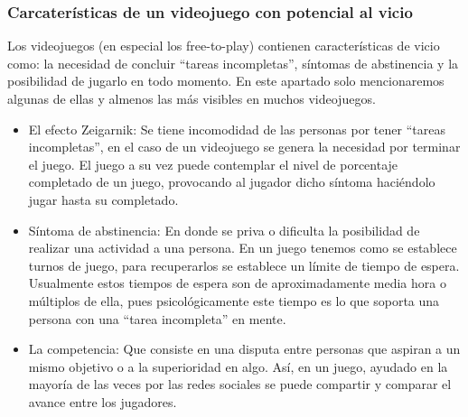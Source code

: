 \subsubsection{Carcaterísticas de un videojuego con potencial al vicio}
Los videojuegos (en especial los free-to-play) contienen características de vicio como: la necesidad de concluir “tareas incompletas”, síntomas de abstinencia y la posibilidad de jugarlo en todo momento. En este apartado solo mencionaremos algunas de ellas y almenos las más visibles en muchos videojuegos.

 \begin{itemize}
 	\item El efecto Zeigarnik: Se tiene incomodidad de las personas por tener “tareas incompletas”, en el caso de un videojuego se genera la necesidad por terminar el juego. El juego a su vez puede contemplar el nivel de porcentaje completado de un juego, provocando al jugador dicho síntoma haciéndolo jugar hasta su completado.
 	
 	\item Síntoma de abstinencia: En donde se priva o dificulta la posibilidad de realizar una actividad a una persona. En un juego tenemos como se establece turnos de juego, para recuperarlos se establece un límite de tiempo de espera. Usualmente estos tiempos de espera son de aproximadamente media hora o múltiplos de ella, pues psicológicamente este tiempo es lo que soporta una persona con una “tarea incompleta” en mente.
 	
 	\item La competencia: Que consiste en una disputa entre personas que aspiran a un mismo objetivo o a la superioridad en algo. Así, en un juego, ayudado en la mayoría de las veces por las redes sociales se puede compartir y comparar el avance entre los jugadores.
 \end{itemize}
 \\[1pt]

